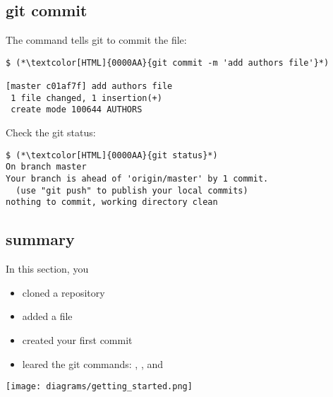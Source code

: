 \subsection{git commit}
\begin{frame}[fragile]
  \subslidetitle

  The command  tells git to commit the file:
  \begin{lstlisting}
$ (*\textcolor[HTML]{0000AA}{git commit -m 'add authors file'}*)

[master c01af7f] add authors file
 1 file changed, 1 insertion(+)
 create mode 100644 AUTHORS
  \end{lstlisting}

  Check the git status:
  \begin{lstlisting}
$ (*\textcolor[HTML]{0000AA}{git status}*)
On branch master
Your branch is ahead of 'origin/master' by 1 commit.
  (use "git push" to publish your local commits)
nothing to commit, working directory clean
  \end{lstlisting}
\end{frame}

\subsection{summary}
\begin{frame}[fragile]
  \subslidetitle

  In this section, you

  \begin{itemize}
    \item cloned a repository
    \item added a file
    \item created your first commit
    \item leared the git commands: , ,  and 
  \end{itemize}

  \texttt{[image: diagrams/getting\_started.png]}
\end{frame}


